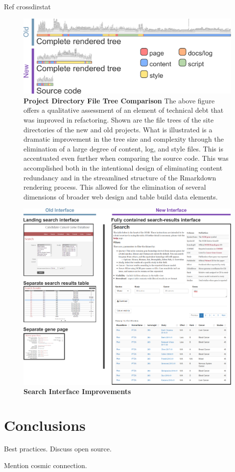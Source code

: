 \documentclass[10pt]{report}
\begin{document}
Ref crossdirstat

\begin{figure}[H]
    \centering
    \includegraphics[width=\textwidth]{fig/file_tree.pdf}
    \caption[Project Directory File Tree Comparison]{\textbf{Project Directory File Tree Comparison} The above figure offers a qualitative assessment of an element of technical debt that was improved in refactoring. Shown are the file trees of the site directories of the new and old projects. What is illustrated is a dramatic improvement in the tree size and complexity through the elimination of a large degree of content, log, and style files. This is accentuated even further when comparing the source code. This was accomplished both in the intentional design of eliminating content redundancy and in the streamlined structure of the Rmarkdown rendering process. This allowed for the elimination of several dimensions of broader web design and table build data elements.}\label{fig:fileTree}
\end{figure}


\begin{figure}[H]
    \centering
    \includegraphics[width=\textwidth]{fig/interface.pdf}
    \caption[Search Interface Improvements]{\textbf{Search Interface Improvements}}\label{fig:interface}
\end{figure}



\chapter{Conclusions}

Best practices. Discuss open source.

Mention cosmic connection.

\printbibliography{}
\end{document}
